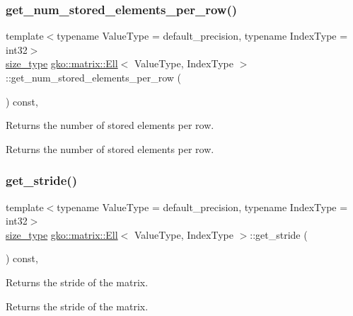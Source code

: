 \subsubsection{\texorpdfstring{get\+\_\+num\+\_\+stored\+\_\+elements\+\_\+per\+\_\+row()}{get\_num\_stored\_elements\_per\_row()}}
{\footnotesize\ttfamily template$<$typename Value\+Type = default\+\_\+precision, typename Index\+Type = int32$>$ \\
\hyperlink{namespacegko_a6e5c95df0ae4e47aab2f604a22d98ee7}{size\+\_\+type} \hyperlink{classgko_1_1matrix_1_1Ell}{gko\+::matrix\+::\+Ell}$<$ Value\+Type, Index\+Type $>$\+::get\+\_\+num\+\_\+stored\+\_\+elements\+\_\+per\+\_\+row (\begin{DoxyParamCaption}{ }\end{DoxyParamCaption}) const\hspace{0.3cm}{\ttfamily [inline]}, {\ttfamily [noexcept]}}



Returns the number of stored elements per row. 

\begin{DoxyReturn}{Returns}
the number of stored elements per row. 
\end{DoxyReturn}
\mbox{\label{classgko_1_1matrix_1_1Ell_a0be6e75dcea0975b10e3389a9eedacc1}} 
\subsubsection{\texorpdfstring{get\+\_\+stride()}{get\_stride()}}
{\footnotesize\ttfamily template$<$typename Value\+Type = default\+\_\+precision, typename Index\+Type = int32$>$ \\
\hyperlink{namespacegko_a6e5c95df0ae4e47aab2f604a22d98ee7}{size\+\_\+type} \hyperlink{classgko_1_1matrix_1_1Ell}{gko\+::matrix\+::\+Ell}$<$ Value\+Type, Index\+Type $>$\+::get\+\_\+stride (\begin{DoxyParamCaption}{ }\end{DoxyParamCaption}) const\hspace{0.3cm}{\ttfamily [inline]}, {\ttfamily [noexcept]}}



Returns the stride of the matrix. 

\begin{DoxyReturn}{Returns}
the stride of the matrix. 
\end{DoxyReturn}
\mbox{\label{classgko_1_1matrix_1_1Ell_a4028e9629a7d96a7a483e6ea4a686a1d}} 
